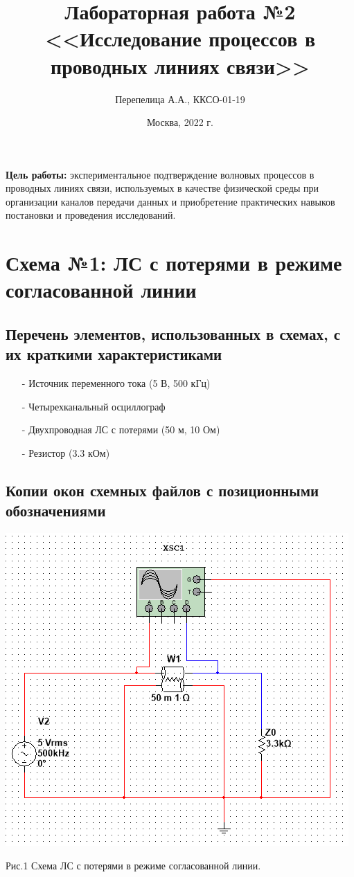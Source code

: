 \documentclass[11pt]{article}
\title{\textbf{Лабораторная работа №2\\<<Исследование процессов в проводных линиях связи>>}}
\author{Перепелица А.А., ККСО-01-19}
\date{Москва, 2022 г.}
\begin{document}
\maketitle
\thispagestyle{empty}
\textbf{Цель работы:} экспериментальное подтверждение волновых процессов в проводных линиях связи, используемых в качестве физической среды при организации каналов передачи данных и приобретение практических навыков постановки и проведения исследований.


\section{ Схема №1: ЛС с потерями в режиме согласованной линии}
\subsection{Перечень элементов, использованных в схемах, с
их краткими характеристиками}
\begin{itemize}
    \item[-] Источник переменного тока (5 В, 500 кГц)
    \item[-] Четырехканальный осциллограф
    \item[-] Двухпроводная ЛС с потерями (50 м, 10 Ом)
    \item[-] Резистор (3.3 кОм)
\end{itemize}

\subsection{Копии окон схемных файлов с позиционными обозначениями}
\includegraphics[width=1\linewidth]{img/first.png}
\begin{center}
    Рис.1 Схема ЛС с потерями в режиме согласованной линии.
\end{center}
\end{document}
